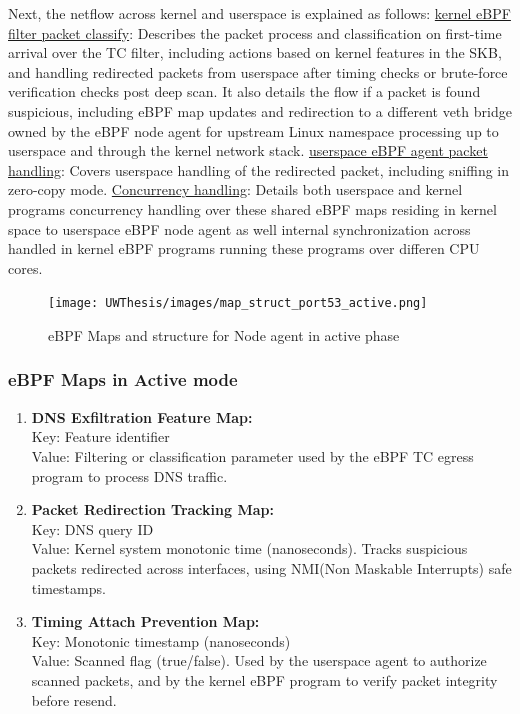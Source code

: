 \documentclass [11pt, proquest] {uwthesis}[2020/02/24]
\begin{document}
Next, the netflow across kernel and userspace is explained as follows:
\hyperref[active:sec1]{kernel eBPF filter packet classify}: Describes the packet process and classification on first-time arrival over the TC filter, including actions based on kernel features in the SKB, and handling redirected packets from userspace after timing checks or brute-force verification checks post deep scan. It also details the flow if a packet is found suspicious, including eBPF map updates and redirection to a different veth bridge owned by the eBPF node agent for upstream Linux namespace processing up to userspace and through the kernel network stack.  
\hyperref[active:sec3]{userspace eBPF agent packet handling}: Covers userspace handling of the redirected packet, including sniffing in zero-copy mode.
\hyperref[active:sec3]{Concurrency handling}: Details both userspace and kernel programs concurrency handling over these shared eBPF maps residing in kernel space to userspace eBPF node agent as well internal synchronization across handled in kernel eBPF programs running these programs over differen CPU cores.


\begin{figure}[H]
\centering
\texttt{[image: UWThesis/images/map\_struct\_port53\_active.png]}
\caption{eBPF Maps and structure for Node agent in active phase}
\label{sec:dp_eBPF_LRU_Maps_active}
\end{figure}

\subsubsection{\textbf{eBPF Maps in Active mode}}
\begin{enumerate}[itemsep=1pt,parsep=0pt]
\label{sec:maps}
\item \textbf{DNS Exfiltration Feature Map:} \\
Key: Feature identifier \\
Value: Filtering or classification parameter used by the eBPF TC egress program to process DNS traffic.

\item \textbf{Packet Redirection Tracking Map:} \\
Key: DNS query ID \\
Value: Kernel system monotonic time (nanoseconds). Tracks suspicious packets redirected across interfaces, using NMI(Non Maskable Interrupts) safe timestamps.

\item \textbf{Timing Attach Prevention Map:} \\
Key: Monotonic timestamp (nanoseconds) \\
Value: Scanned flag (true/false). Used by the userspace agent to authorize scanned packets, and by the kernel eBPF program to verify packet integrity before resend.
\end{enumerate}
\end{document}
